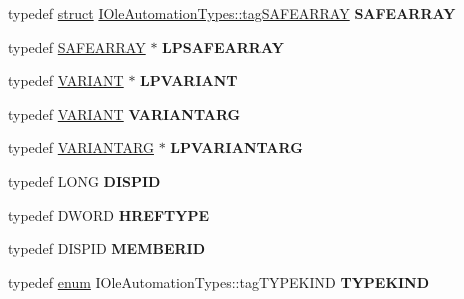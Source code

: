 \begin{DoxyCompactItemize}
typedef \hyperlink{interfacestruct}{struct} \hyperlink{struct_i_ole_automation_types_1_1tag_s_a_f_e_a_r_r_a_y}{I\+Ole\+Automation\+Types\+::tag\+S\+A\+F\+E\+A\+R\+R\+AY} {\bfseries S\+A\+F\+E\+A\+R\+R\+AY}
\item 
\mbox{\label{interface_i_ole_automation_types_a2bf043da8986af775bc402a94a0779a3}} 
typedef \hyperlink{struct_i_ole_automation_types_1_1tag_s_a_f_e_a_r_r_a_y}{S\+A\+F\+E\+A\+R\+R\+AY} $\ast$ {\bfseries L\+P\+S\+A\+F\+E\+A\+R\+R\+AY}
\item 
\mbox{\label{interface_i_ole_automation_types_a0eeeaa5e497e1b549234bbd3189d13ac}} 
typedef \hyperlink{structtag_v_a_r_i_a_n_t}{V\+A\+R\+I\+A\+NT} $\ast$ {\bfseries L\+P\+V\+A\+R\+I\+A\+NT}
\item 
\mbox{\label{interface_i_ole_automation_types_a82f301a6953de0430c1cc7bb79b0fb71}} 
typedef \hyperlink{structtag_v_a_r_i_a_n_t}{V\+A\+R\+I\+A\+NT} {\bfseries V\+A\+R\+I\+A\+N\+T\+A\+RG}
\item 
\mbox{\label{interface_i_ole_automation_types_a3889dca0c911b406a0eb56447476eaa8}} 
typedef \hyperlink{structtag_v_a_r_i_a_n_t}{V\+A\+R\+I\+A\+N\+T\+A\+RG} $\ast$ {\bfseries L\+P\+V\+A\+R\+I\+A\+N\+T\+A\+RG}
\item 
\mbox{\label{interface_i_ole_automation_types_ad251165f213ed4653a13ad51170793ab}} 
typedef L\+O\+NG {\bfseries D\+I\+S\+P\+ID}
\item 
\mbox{\label{interface_i_ole_automation_types_a7f601f0d98172b619423275275a2ef90}} 
typedef D\+W\+O\+RD {\bfseries H\+R\+E\+F\+T\+Y\+PE}
\item 
\mbox{\label{interface_i_ole_automation_types_a229d07b11f8ce00fb81dd017b3095cc4}} 
typedef D\+I\+S\+P\+ID {\bfseries M\+E\+M\+B\+E\+R\+ID}
\item 
\mbox{\label{interface_i_ole_automation_types_af1f9542959667337dd9601b26a2977cc}} 
typedef \hyperlink{interfaceenum}{enum} I\+Ole\+Automation\+Types\+::tag\+T\+Y\+P\+E\+K\+I\+ND {\bfseries T\+Y\+P\+E\+K\+I\+ND}

\end{DoxyCompactItemize}
